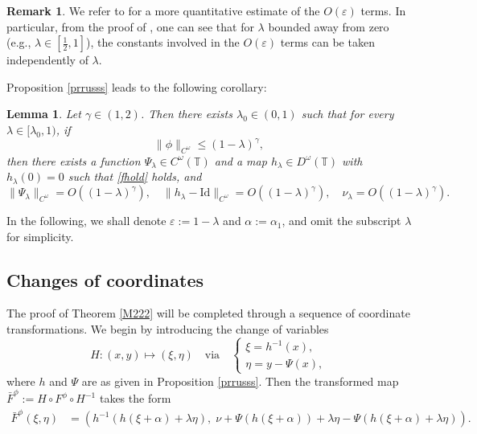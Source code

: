 \documentclass{amsart}
\newtheorem{Lemma}[Definition]{Lemma}
\theoremstyle{definition}
\newtheorem{Remark}[Definition]{Remark}
\begin{document}
\begin{Remark}
We refer to \cite[Theorem A.1]{Mas1} for a more quantitative estimate of the $O(\varepsilon)$ terms. In particular, from the proof of \cite[Theorem 5.1]{Mas1}, one can see that for $\lambda$ bounded away from zero (e.g., $\lambda \in [\frac{1}{2}, 1]$), the constants involved in the $O(\varepsilon)$ terms can be taken independently of $\lambda$.
\end{Remark}

Proposition \ref{prrusss} leads to the following corollary:

\begin{Lemma}
Let $\gamma \in (1, 2)$. Then there exists $\lambda_0 \in (0, 1)$ such that for every $\lambda \in [\lambda_0, 1)$, if
\[
\|\phi\|_{C^\omega} \leq (1 - \lambda)^\gamma,
\]
then there exists a function $\Psi_\lambda \in C^\omega(\mathbb{T})$ and a map $h_\lambda \in D^\omega(\mathbb{T})$ with $h_\lambda(0) = 0$ such that \eqref{fhold} holds, and
\[
\|\Psi_\lambda\|_{C^\omega} = O((1 - \lambda)^\gamma), \quad \|h_\lambda - \mathrm{Id}\|_{C^\omega} = O((1 - \lambda)^\gamma), \quad \nu_\lambda = O((1 - \lambda)^\gamma).
\]
\end{Lemma}

In the following, we shall denote $\varepsilon := 1 - \lambda$ and $\alpha := \alpha_1$, and omit the subscript $\lambda$ for simplicity.


\subsection{Changes of coordinates}

The proof of Theorem \ref{M222} will be completed through a sequence of coordinate transformations. We begin by introducing the change of variables
\[
H: (x, y) \mapsto (\xi, \eta) \quad \text{via} \quad
\left\{
  \begin{array}{l}
    \xi = h^{-1}(x), \\
    \eta = y - \Psi(x),
  \end{array}
\right.
\]
where $h$ and $\Psi$ are as given in Proposition \ref{prrusss}. Then the transformed map $\bar{F}^\phi := H \circ F^{\phi} \circ H^{-1}$ takes the form
\begin{align*}
\bar{F}^\phi(\xi, \eta)
&= \left(h^{-1}(h(\xi + \alpha) + \lambda \eta),\; \nu + \Psi(h(\xi + \alpha)) + \lambda \eta - \Psi(h(\xi + \alpha) + \lambda \eta)\right).
\end{align*}
\end{document}
